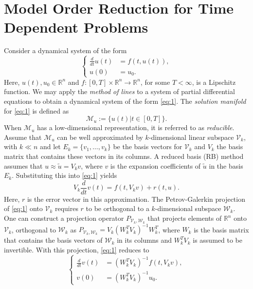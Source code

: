 \section{Model Order Reduction for Time Dependent Problems} \label{sec:mor}

Consider a dynamical system of the form
\begin{equation} \label{eq:1}
	\left\{
	\begin{aligned}
		\frac{d}{dt} u(t) &= f(t,u(t)),\\
		u(0) &= u_0.
	\end{aligned}
	\right.
\end{equation}
Here, $u(t),u_0\in \mathbb R^{n}$ and $f: [0,T]\times \mathbb R^{n} \to \mathbb R^{n}$, for some $T<\infty$, is a Lipschitz function. We may apply the \emph{method of lines} \cite{Edsberg:2008:ICM:1477735} to a system of partial differential equations to obtain a dynamical system of the form \eqref{eq:1}. The \emph{solution manifold} for \eqref{eq:1} is defined as
\begin{equation} \label{eq:2}
	\mathcal M_u := \{ u(t) | t \in [0,T] \}.
\end{equation}
When $\mathcal M_u$ has a low-dimensional representation, it is referred to as \emph{reducible}. Assume that $\mathcal M_u$ can be well approximated by $k$-dimensional linear subspace $\mathcal V_k$, with $k\ll n$ and let $E_k = \{ v_1,\dots,v_k \}$ be the basis vectors for $\mathcal V_k$ and $V_k$ the basis matrix that contains these vectors in its columns. A reduced basis (RB) method assumes that $u \approx \tilde u = V_k v$, where $v$ is the expansion coefficients of $\tilde u$ in the basis $E_k$. Substituting this into \eqref{eq:1} yields
\begin{equation} \label{eq:3}
	V_k \frac{d}{dt} v(t) = f(t,V_{k}v) + r(t,u).	
\end{equation}
Here, $r$ is the error vector in this approximation. The Petrov-Galerkin projection of \eqref{eq:1} onto $\mathcal V_k$ requires $r$ to be orthogonal to a $k$-dimensional subspace $\mathcal W_k$. One can construct a projection operator $P_{\mathcal V_{k},\mathcal W_k}$ that projects elements of $\mathbb R^{n}$ onto $\mathcal V_k$, orthogonal to $\mathcal W_k$ as $P_{\mathcal V_{k},\mathcal W_k} = V_k(W_k^TV_k)^{-1}W_k^T$, where $W_k$ is the basis matrix that contains the basis vectors of $\mathcal W_k$ in its columns and $W_k^TV_k$ is assumed to be invertible. With this projection, \eqref{eq:1} reduces to
\begin{equation} \label{eq:4}
	\left\{
	\begin{aligned}
		\frac{d}{dt} v(t) &= (W_k^TV_k)^{-1} f(t,V_{k}v),\\
		v(0) &= (W_k^TV_k)^{-1}u_0.
	\end{aligned}
	\right.
\end{equation}
